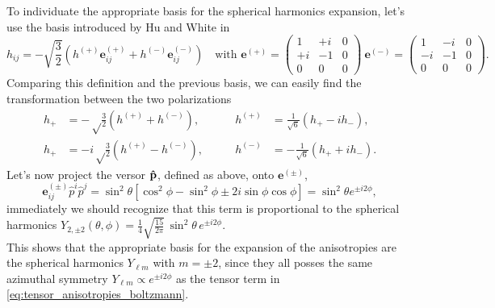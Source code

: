 To individuate the appropriate basis for the spherical harmonics expansion, let's use the basis introduced by Hu and White in \cite{HuWhite}
\begin{equation}
    \label{eq:HuWhiteBasis}
    h_{ij}=-\sqrt{\frac{3}{2}}(h^{(+)}\mathbf{e}_{ij}^{(+)}+h^{(-)}\mathbf{e}_{ij}^{(-)}) \quad \text{with } \mathbf{e}^{(+)}=\begin{pmatrix}
        1&+i&0\\+i&-1&0\\0&0&0
    \end{pmatrix}\ \mathbf{e}^{(-)}=\begin{pmatrix}
        1&-i&0\\-i&-1&0\\0&0&0
    \end{pmatrix}.
\end{equation}
Comparing this definition and the previous basis, we can easily find the transformation between the two polarizations
\begin{align*}
    h_{\boldsymbol{+}}&=-\sqrt\frac{3}{2}(h^{(+)}+h^{(-)}),\qquad &h^{(+)}&=\frac{1}{\sqrt{6}}(h_{\boldsymbol{+}}-ih_{\boldsymbol{-}}),\\ h_{\boldsymbol{+}}&=-i\sqrt\frac{3}{2}(h^{(+)}-h^{(-)}),\qquad &h^{(-)}&=-\frac{1}{\sqrt{6}}(h_{\boldsymbol{+}}+ih_{\boldsymbol{-}}).
\end{align*}
Let's now project the versor $\mathbf{\hat{p}}$, defined as above, onto $\mathbf{e}^{(\pm)}$, 
$$\mathbf{e}_{ij}^{(\pm)}\hat p^i\hat p^j=\sin^2\theta[\cos^2\phi-\sin^2\phi\pm2i\sin\phi\cos\phi]=\sin^2\theta e^{\pm i2\phi},$$
immediately we should recognize that this term is proportional to the spherical harmonics $Y_{2,\pm2}(\theta,\phi)=\frac{1}{4} \sqrt{\frac{15}{2\pi}} \, \sin^2\theta \, e^{ \pm i2\phi}$.\\This shows that the appropriate basis for the expansion of the anisotropies are the spherical harmonics $Y_{\ell m}$ with $m=\pm2$, since they all posses the same azimuthal symmetry $Y_{\ell m} \propto e^{\pm i2\phi}$ as the tensor term in \eqref{eq:tensor_anisotropies_boltzmann}.

